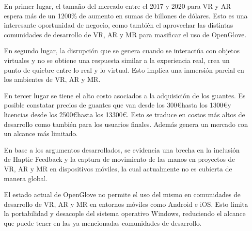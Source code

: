 
En primer lugar, el tamaño del mercado entre el 2017 y 2020 para VR y AR espera más de un 1200\% de aumento en sumas de billones de dólares. Esto es una interesante oportunidad de negocio, como también el aprovechar las distintas comunidades de desarrollo de VR, AR y MR para masificar el uso de OpenGlove.

En segundo lugar, la disrupción que se genera cuando se interactúa con objetos virtuales y no se obtiene una respuesta similar a la experiencia real, crea un punto de quiebre entre lo real y lo virtual. Esto implica una inmersión parcial en los ambientes de VR, AR y MR.

En tercer lugar se tiene el alto costo asociados a la adquisición de los guantes. Es posible constatar precios de guantes que van desde los 300\euro \space hasta los 1300\euro \space y licencias desde los 2500\euro \space hasta los 13300\euro . Esto se traduce en costos más altos de desarrollo como también para los usuarios finales. Además genera un mercado con un alcance más limitado.

En base a los argumentos desarrollados, se evidencia una brecha en la inclusión de Haptic Feedback  y la captura de movimiento de las manos en proyectos de VR, AR y MR en dispositivos móviles, la cual actualmente no es cubierta de manera global.

El estado actual de OpenGlove no permite el uso del mismo en comunidades de desarrollo de VR, AR y MR en entornos móviles como Android e iOS. Esto limita la portabilidad y desacople del sistema operativo Windows, reduciendo el alcance que puede tener en las ya mencionadas comunidades de desarrollo.


